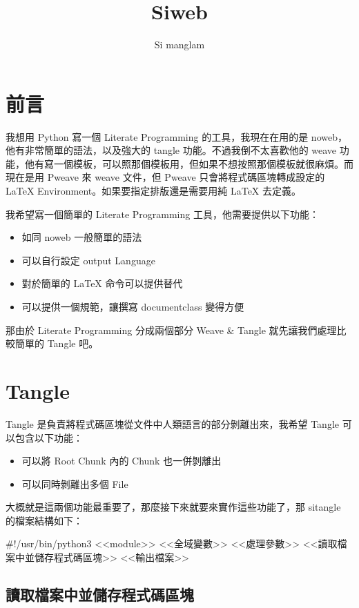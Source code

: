 \documentclass[12pt, a4paper]{NGPLB}
\title{Siweb}
\author{Si manglam}
\begin{document}
\maketitle
\tableofcontents

\chapter{前言}
我想用 Python 寫一個 Literate Programming 的工具，我現在在用的是 noweb，他有非常簡單的語法，以及強大的 tangle 功能。不過我倒不太喜歡他的 weave 功能，他有寫一個模板，可以照那個模板用，但如果不想按照那個模板就很麻煩。而現在是用 Pweave 來 weave 文件，但 Pweave 只會將程式碼區塊轉成設定的 LaTeX Environment。如果要指定排版還是需要用純 LaTeX 去定義。

我希望寫一個簡單的 Literate Programming 工具，他需要提供以下功能：

\begin{itemize}
\item 如同 noweb 一般簡單的語法
\item 可以自行設定 output Language
\item 對於簡單的 LaTeX 命令可以提供替代
\item 可以提供一個規範，讓撰寫 documentclass 變得方便
\end{itemize}

那由於 Literate Programming 分成兩個部分 Weave \& Tangle 就先讓我們處理比較簡單的 Tangle 吧。

\chapter{Tangle}

Tangle 是負責將程式碼區塊從文件中人類語言的部分剝離出來，我希望 Tangle 可以包含以下功能：

\begin{itemize}
\item 可以將 Root Chunk 內的 Chunk 也一併剝離出
\item 可以同時剝離出多個 File
\end{itemize}

大概就是這兩個功能最重要了，那麼接下來就要來實作這些功能了，那 sitangle 的檔案結構如下：


\begin{mylisting}
#!/usr/bin/python3
<<module>>
<<全域變數>>
<<處理參數>>
<<讀取檔案中並儲存程式碼區塊>>
<<輸出檔案>>
\end{mylisting}


\section{讀取檔案中並儲存程式碼區塊}
\end{document}
